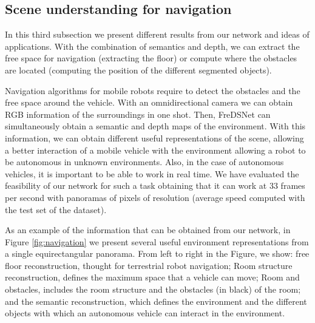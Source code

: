 \documentclass[letterpaper, 10 pt, conference]{ieeeconf}
\begin{document}
\subsection{Scene understanding for navigation}
In this third subsection we present different results from our network and ideas of applications. With the combination of semantics and depth, we can extract the free space for navigation (extracting the floor) or compute where the obstacles are located (computing the position of the different segmented objects).

Navigation algorithms for mobile robots require to detect the obstacles and the free space around the vehicle. With an omnidirectional camera we can obtain RGB information of the surroundings in one shot. Then, FreDSNet can simultaneously obtain a semantic and depth maps of the environment. With this information, we can obtain different useful representations of the scene, allowing a better interaction of a mobile vehicle with the environment allowing a robot to be autonomous in unknown environments.
Also, in the case of autonomous vehicles, it is important to be able to work in real time. 
We have evaluated the feasibility of our network for such a task obtaining that it can work at 33 frames per second with panoramas of  pixels of resolution (average speed computed with the test set of the dataset).

As an example of the information that can be obtained from our network, in Figure \ref{fig:navigation} we present several useful environment representations from a single equirectangular panorama. From left to right in the Figure, we show: free floor reconstruction, thought for terrestrial	robot navigation; Room structure reconstruction, defines the maximum space that a vehicle can move; Room and obstacles, includes the room structure and the obstacles (in black) of the room; and the semantic reconstruction, which defines the environment and the different objects with which an autonomous vehicle can interact in the environment.
\end{document}
